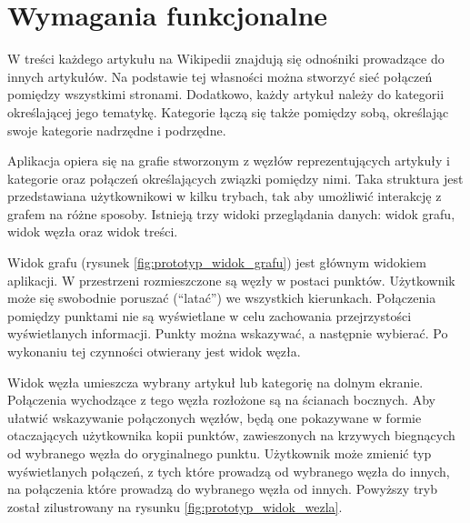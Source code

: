 \section{Wymagania funkcjonalne}
\label{sec:wymagania-funkcjonalne}

W treści każdego artykułu na Wikipedii znajdują się odnośniki prowadzące do innych artykułów. Na podstawie tej własności można stworzyć sieć połączeń pomiędzy wszystkimi stronami. Dodatkowo, każdy artykuł należy do kategorii określającej jego tematykę. Kategorie łączą się także pomiędzy sobą, określając swoje kategorie nadrzędne i podrzędne.

Aplikacja opiera się na grafie stworzonym z węzłów reprezentujących artykuły i kategorie oraz połączeń określających związki pomiędzy nimi. Taka struktura jest przedstawiana użytkownikowi w kilku trybach, tak aby umożliwić interakcję z grafem na różne sposoby. Istnieją trzy widoki przeglądania danych: widok grafu, widok węzła oraz widok treści.

Widok grafu (rysunek \ref{fig:prototyp_widok_grafu}) jest głównym widokiem aplikacji. W przestrzeni rozmieszczone są węzły w postaci punktów. Użytkownik może się swobodnie poruszać (``latać'') we wszystkich kierunkach. Połączenia pomiędzy punktami nie są wyświetlane w celu zachowania przejrzystości wyświetlanych informacji. Punkty można wskazywać, a następnie wybierać. Po wykonaniu tej czynności otwierany jest widok węzła.


Widok węzła umieszcza wybrany artykuł lub kategorię na dolnym ekranie. Połączenia wychodzące z tego węzła rozłożone są na ścianach bocznych. Aby ułatwić wskazywanie połączonych węzłów, będą one pokazywane w formie otaczających użytkownika kopii punktów, zawieszonych na krzywych biegnących od wybranego węzła do oryginalnego punktu. Użytkownik może zmienić typ wyświetlanych połączeń, z tych które prowadzą od wybranego węzła do innych, na połączenia które prowadzą do wybranego węzła od innych. Powyższy tryb został zilustrowany na rysunku \ref{fig:prototyp_widok_wezla}.

